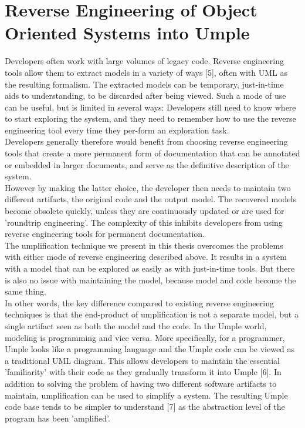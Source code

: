 \lhead{\emph{\leftmark}}  %
\chapter{Reverse Engineering of Object Oriented Systems into Umple}
\label{chap:core}
Developers often work with large volumes of legacy code. Reverse engineering tools allow them to extract models in a variety of ways [5], often with UML as the resulting formalism.
The extracted models can be temporary, just-in-time aids to understanding, to be discarded after being viewed. Such a mode of use can be useful, but is limited in several ways: Developers still need to know where to start exploring the system, and they need to remember how to use the reverse engineering tool every time they per-form an exploration task. \\
Developers generally therefore would benefit from choosing reverse engineering tools that create a more permanent form of documentation that can be annotated or embedded in larger documents, and serve as the definitive description of the system. \\
However by making the latter choice, the developer then needs to maintain two different artifacts, the original code and the output model. The recovered models become obsolete quickly, unless they are continuously updated or are used for 'roundtrip engineering'.  The complexity of this inhibits developers from using reverse engineering tools for permanent documentation.\\
The umplification technique we present in this thesis overcomes the problems with either mode of reverse engineering described above. It results in a system with a model that can be explored as easily as with just-in-time tools. But there is also no issue with maintaining the model, because model and code become the same thing.\\
In other words, the key difference compared to existing reverse engineering techniques is that the end-product of umplification is not a separate model, but a single artifact seen as both the model and the code. In the Umple world, modeling is programming and vice versa. More specifically, for a programmer, Umple looks like a programming language and the Umple code can be viewed as a traditional UML diagram. This allows developers to maintain the essential 'familiarity' with their code as they gradually transform it into Umple [6]. 
In addition to solving the problem of having two different software artifacts to maintain,   umplification can be used to simplify a system. The resulting Umple code base tends to be simpler to understand [7] as the abstraction level of the program has been 'amplified'.


